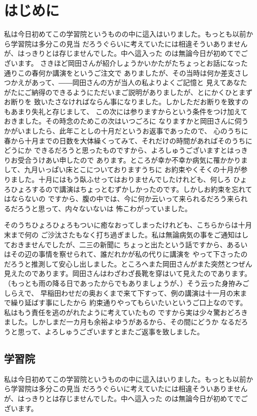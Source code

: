 \chapter{はじめに}
私は今日初めてこの学習院というものの中に這入はいりました。もっとも以前から学習院は多分この見当
だろうぐらいに考えていたには相違そういありませんが、はっきりとは存じませんでした。中へ這入った
のは無論今日が初めてでございます。
さきほど岡田さんが紹介しょうかいかたがたちょっとお話になった通りこの春何か講演をというご注文で
ありましたが、その当時は何か差支さしつかえがあって、――岡田さんの方が当人の私よりよくご記憶と
見えてあなたがたにご納得のできるようにただいまご説明がありましたが、とにかくひとまずお断りを
致いたさなければならん事になりました。しかしただお断りを致すのもあまり失礼と存じまして、
この次には参りますからという条件をつけ加えておきました。その時念のためこの次はいつごろに
なりますかと岡田さんに伺うかがいましたら、此年ことしの十月だというお返事であったので、
心のうちに春から十月までの日数を大体繰くってみて、それだけの時間があればそのうちにどうにか
できるだろうと思ったものですから、よろしゅうございますとはっきりお受合うけあい申したので
あります。ところが幸か不幸か病気に罹かかりまして、九月いっぱい床とこについておりますうちに
お約束やくそくの十月が参りました。十月にはもう臥ふせってはおりませんでしたけれども、何しろ
ひょろひょろするので講演はちょっとむずかしかったのです。しかしお約束を忘れてはならないの
ですから、腹の中では、今に何か云いって来られるだろう来られるだろうと思って、内々ないないは
怖こわがっていました。

そのうちひょろひょろもついに癒なおってしまったけれども、こちらからは十月末まで何の
ご沙汰さたもなく打ち過ぎました。私は無論病気の事をご通知はしておきませんでしたが、二三の新聞に
ちょっと出たという話ですから、あるいはその辺の事情を察せられて、誰だれかが私の代りに講演を
やって下さったのだろうと推測して安心し出しました。ところへまた岡田さんがまた突然とつぜん
見えたのであります。岡田さんはわざわざ長靴を穿はいて見えたのであります。
（もっとも雨の降る日であったからでもありましょうが、）そう云った身拵みごしらえで、
早稲田わせだの奥おくまで来て下すって、例の講演は十一月の末まで繰り延ばす事にしたから
約束通りやってもらいたいというご口上なのです。私はもう責任を逃のがれたように考えていたもの
ですから実は少々驚おどろきました。しかしまだ一カ月も余裕よゆうがあるから、その間にどうか
なるだろうと思って、よろしゅうございますとまたご返事を致しました。


\section{学習院}
私は今日初めてこの学習院というものの中に這入はいりました。もっとも以前から学習院は多分この見当
だろうぐらいに考えていたには相違そういありませんが、はっきりとは存じませんでした。中へ這入った
のは無論今日が初めてでございます。

